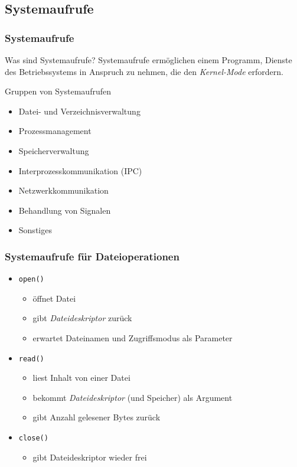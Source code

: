 \subsection{Systemaufrufe}

\begin{frame}
  \frametitle{Systemaufrufe}

  \begin{block}{Was sind Systemaufrufe?}
    Systemaufrufe ermöglichen einem Programm, Dienste des Betriebssystems in Anspruch zu nehmen,
    die den \emph{Kernel-Mode} erfordern.
  \end{block}
  
  \begin{block}{Gruppen von Systemaufrufen}

    \begin{itemize}
      \item Datei- und Verzeichnisverwaltung
      \item Prozessmanagement
      \item Speicherverwaltung
      \item Interprozesskommunikation (IPC)
      \item Netzwerkkommunikation
      \item Behandlung von Signalen
      \item Sonstiges
    \end{itemize}
  \end{block}

\end{frame}

\begin{frame}
  \frametitle{Systemaufrufe für Dateioperationen}

  \begin{itemize}
    \item \texttt{open()} 
      \begin{itemize}
        \item öffnet Datei
        \item gibt \emph{Dateideskriptor} zurück
        \item erwartet Dateinamen und Zugriffsmodus als Parameter
      \end{itemize}

    \item \texttt{read()}
      \begin{itemize}
        \item liest Inhalt von einer Datei
        \item bekommt \emph{Dateideskriptor} (und Speicher) als Argument
        \item gibt Anzahl gelesener Bytes zurück
      \end{itemize}

    \item \texttt{close()}
      \begin{itemize}
        \item gibt Dateideskriptor wieder frei
      \end{itemize}

  \end{itemize}
\end{frame}

